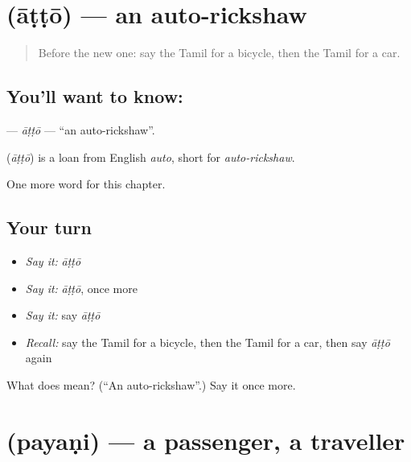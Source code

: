 \section[\texorpdfstring{\ta{ஆட்டோ} (āṭṭō)}{ஆட்டோ (āṭṭō)}]{ (āṭṭō) — an auto-rickshaw}

\label{lesson:TA-C174-atto}



\begin{quote}
Before the new one: say the Tamil for a bicycle, then the Tamil for a car.
\end{quote}

\subsection*{You'll want to know: }
\textbf{} — \emph{āṭṭō} — \textquotedblleft{}an auto-rickshaw\textquotedblright{}.

\begin{cousinweb}
\textbf{} (\emph{āṭṭō}) is a loan from English \emph{auto}, short for \emph{auto-rickshaw}.
\end{cousinweb}

\begin{grammarlens}[title={What you've built}]
One more word for this chapter.
\end{grammarlens}

\subsection*{Your turn}
\begin{itemize}
\raggedright
  \item \emph{Say it:} \emph{āṭṭō}
  \item \emph{Say it:} \emph{āṭṭō}, once more
  \item \emph{Say it:} say \emph{āṭṭō}
  \item \emph{Recall:} say the Tamil for a bicycle, then the Tamil for a car, then say \emph{āṭṭō} again
\end{itemize}

\begin{tcolorbox}[breakable,colback=teal!4,colframe=teal!35!black,title={Before you move on}]
What does  mean? (\textquotedblleft{}An auto-rickshaw\textquotedblright{}.) Say it once more.
\end{tcolorbox}
\section[\texorpdfstring{\ta{பயணி} (payaṇi)}{பயணி (payaṇi)}]{ (payaṇi) — a passenger, a traveller}

